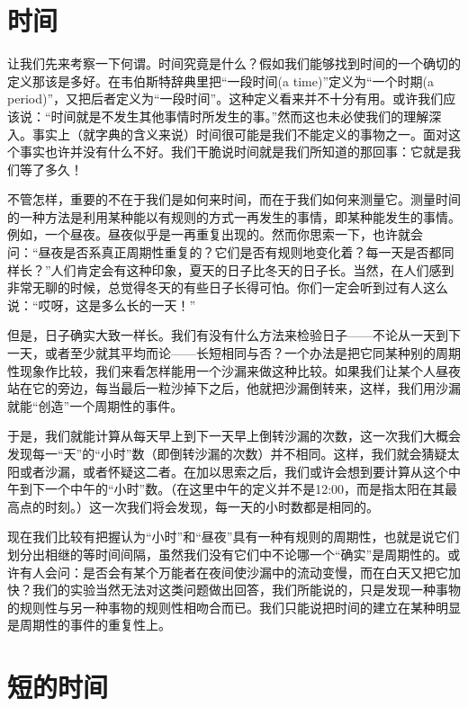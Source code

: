 \section{时间}

让我们先来考察一下何谓。时间究竟是什么？假如我们能够找到时间的一个确切的定义那该是多好。在韦伯斯特辞典里把“一段时间(a time)”定义为“一个时期(a period)”，又把后者定义为“一段时间”。这种定义看来并不十分有用。或许我们应该说：“时间就是不发生其他事情时所发生的事。”然而这也未必使我们的理解深入。事实上（就字典的含义来说）时间很可能是我们不能定义的事物之一。面对这个事实也许并没有什么不好。我们干脆说时间就是我们所知道的那回事：它就是我们等了多久！

不管怎样，重要的不在于我们是如何来时间，而在于我们如何来测量它。测量时间的一种方法是利用某种能以有规则的方式一再发生的事情，即某种能发生的事情。例如，一个昼夜。昼夜似乎是一再重复出现的。然而你思索一下，也许就会问：“昼夜是否系真正周期性重复的？它们是否有规则地变化着？每一天是否都同样长？”人们肯定会有这种印象，夏天的日子比冬天的日子长。当然，在人们感到非常无聊的时候，总觉得冬天的有些日子长得可怕。你们一定会听到过有人这么说：“哎呀，这是多么长的一天！”

但是，日子确实大致一样长。我们有没有什么方法来检验日子——不论从一天到下一天，或者至少就其平均而论——长短相同与否？一个办法是把它同某种别的周期性现象作比较，我们来看怎样能用一个沙漏来做这种比较。如果我们让某个人昼夜站在它的旁边，每当最后一粒沙掉下之后，他就把沙漏倒转来，这样，我们用沙漏就能“创造”一个周期性的事件。

于是，我们就能计算从每天早上到下一天早上倒转沙漏的次数，这一次我们大概会发现每一“天”的“小时”数（即倒转沙漏的次数）并不相同。这样，我们就会猜疑太阳或者沙漏，或者怀疑这二者。在加以思索之后，我们或许会想到要计算从这个中午到下一个中午的“小时”数。（在这里中午的定义并不是12:00，而是指太阳在其最高点的时刻。）这一次我们将会发现，每一天的小时数都是相同的。

现在我们比较有把握认为“小时”和“昼夜”具有一种有规则的周期性，也就是说它们划分出相继的等时间间隔，虽然我们没有它们中不论哪一个“确实”是周期性的。或许有人会问：是否会有某个万能者在夜间使沙漏中的流动变慢，而在白天又把它加快？我们的实验当然无法对这类问题做出回答，我们所能说的，只是发现一种事物的规则性与另一种事物的规则性相吻合而已。我们只能说把时间的建立在某种明显是周期性的事件的重复性上。


\section{短的时间}

